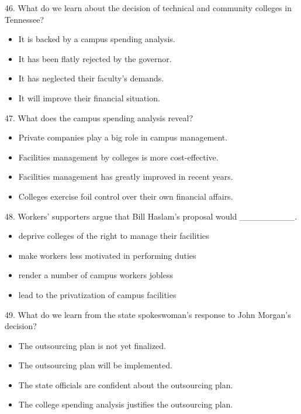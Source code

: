 \documentclass[UTF8,11pt]{ctexart}
\begin{document}
46. What do we learn about the decision of technical and community colleges in Tennessee?


\begin{itemize}[leftmargin=2em,itemsep=.2em,topsep=.4em]\item[A.] It is backed by a campus spending analysis.
\item[B.] It has been flatly rejected by the governor.
\item[C.] It has neglected their faculty's demands.
\item[D.] It will improve their financial situation.
\end{itemize}

47. What does the campus spending analysis reveal?


\begin{itemize}[leftmargin=2em,itemsep=.2em,topsep=.4em]\item[A.] Private companies play a big role in campus management.
\item[B.] Facilities management by colleges is more cost-effective.
\item[C.] Facilities management has greatly improved in recent years.
\item[D.] Colleges exercise foil control over their own financial affairs.
\end{itemize}

48. Workers' supporters argue that Bill Haslam's proposal would \_\_\_\_\_\_\_\_\_.


\begin{itemize}[leftmargin=2em,itemsep=.2em,topsep=.4em]\item[A.] deprive colleges of the right to manage their facilities
\item[B.] make workers less motivated in performing duties
\item[C.] render a number of campus workers jobless
\item[D.] lead to the privatization of campus facilities
\end{itemize}

49. What do we learn from the state spokeswoman's response to John Morgan's decision?


\begin{itemize}[leftmargin=2em,itemsep=.2em,topsep=.4em]\item[A.] The outsourcing plan is not yet finalized.
\item[B.] The outsourcing plan will be implemented.
\item[C.] The state officials are confident about the outsourcing plan.
\item[D.] The college spending analysis justifies the outsourcing plan.
\end{itemize}
\end{document}
